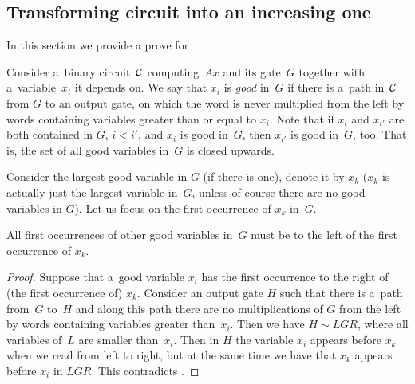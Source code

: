 \documentclass{toc}
\begin{document}


\subsection{Transforming circuit into an increasing one}
\label{sec:increasing_circuits}

In this section we provide a prove for 

Consider a~binary circuit~${\cal C}$ computing~$Ax$ and its gate~$G$ together with a~variable~$x_i$ it depends on.
We say that $x_i$ is \emph{good} in~$G$ if there is
a~path in~${\cal C}$ from $G$ to an output gate, on which the word is never multiplied from the left by words containing variables greater than or equal to $x_i$.
Note that if $x_i$ and $x_{i'}$ are both contained in $G$, $i<i'$, and $x_i$ is good in~$G$, then $x_{i'}$ is good in~$G$, too. That is, the set of all good variables in~$G$ is closed upwards.

Consider the largest good variable in $G$ (if there is one), denote it by $x_k$ ($x_k$ is actually just the largest variable in~$G$, unless of course there are no good variables in $G$). Let us focus on the first occurrence of $x_k$ in~$G$.

\begin{claim}
    All first occurrences of other good variables in~$G$ must be to the left of the first occurrence of $x_k$.
\end{claim}

\begin{proof}
    Suppose that a~good variable $x_i$ has the first occurrence to the right of (the first occurrence of) $x_k$. Consider an output gate $H$ such that there is a~path from~$G$ to~$H$ and along this path there are no multiplications of $G$ from the left by words containing variables greater than~$x_i$. Then we have $H \sim LGR$, where all variables of~$L$ are smaller than~$x_i$. Then in $H$ the variable $x_i$ appears before $x_k$ when we read from left to right, but at the same time we have that $x_k$ appears before $x_i$ in $LGR$. This contradicts .
\end{proof}
\end{document}
